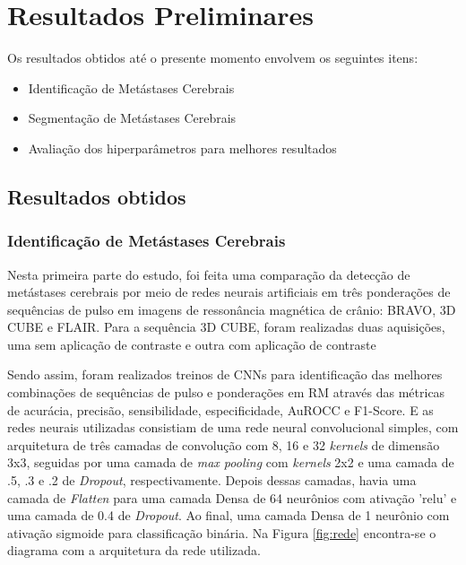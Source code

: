 \chapter{Resultados Preliminares}\label{chap:resultados}

Os resultados obtidos até o presente momento envolvem os seguintes itens:

\begin{itemize}
    \item Identificação de Metástases Cerebrais
    \item Segmentação de Metástases Cerebrais
    \item Avaliação dos hiperparâmetros para melhores resultados
\end{itemize}

\section{Resultados obtidos}

\subsection{Identificação de Metástases Cerebrais}

Nesta primeira parte do estudo, foi feita uma comparação da detecção de metástases cerebrais por meio de redes neurais artificiais em três ponderações de sequências de pulso em imagens de ressonância magnética de crânio: BRAVO, 3D CUBE e FLAIR. Para a sequência 3D CUBE, foram realizadas duas aquisições, uma sem aplicação de contraste e outra com aplicação de contraste

Sendo assim, foram realizados treinos de CNNs para identificação das melhores combinações de sequências de pulso e ponderações em RM através das métricas de acurácia, precisão, sensibilidade, especificidade, AuROCC e F1-Score. E as redes neurais utilizadas consistiam de uma rede neural convolucional simples, com arquitetura de três camadas de convolução com 8, 16 e 32 \textit{kernels} de dimensão 3x3, seguidas por uma camada de \textit{max pooling} com \textit{kernels} 2x2 e uma camada de .5, .3 e .2 de \textit{Dropout}, respectivamente. Depois dessas camadas, havia uma camada de \textit{Flatten} para uma camada Densa de 64 neurônios com ativação 'relu' e uma camada de 0.4 de \textit{Dropout}. Ao final, uma camada Densa de 1 neurônio com ativação sigmoide para classificação binária. Na Figura \ref{fig:rede} encontra-se o diagrama com a arquitetura da rede utilizada.

